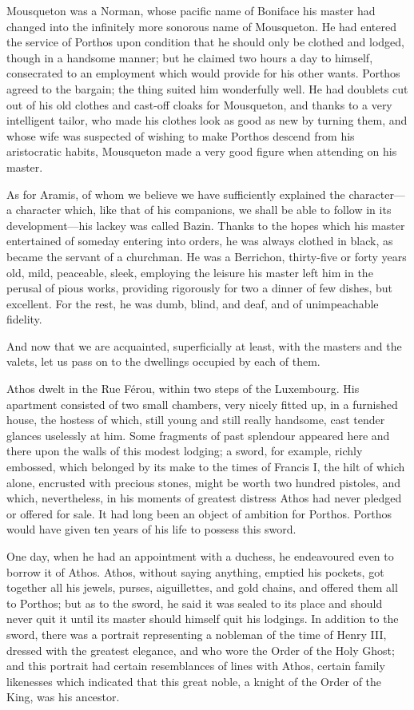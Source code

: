 Mousqueton was a Norman, whose pacific name of Boniface his master had changed into the infinitely more sonorous name of Mousqueton. He had entered the service of Porthos upon condition that he should only be clothed and lodged, though in a handsome manner; but he claimed two hours a day to himself, consecrated to an employment which would provide for his other wants. Porthos agreed to the bargain; the thing suited him wonderfully well. He had doublets cut out of his old clothes and cast-off cloaks for Mousqueton, and thanks to a very intelligent tailor, who made his clothes look as good as new by turning them, and whose wife was suspected of wishing to make Porthos descend from his aristocratic habits, Mousqueton made a very good figure when attending on his master. 

As for Aramis, of whom we believe we have sufficiently explained the character---a character which, like that of his companions, we shall be able to follow in its development---his lackey was called Bazin. Thanks to the hopes which his master entertained of someday entering into orders, he was always clothed in black, as became the servant of a churchman. He was a Berrichon, thirty-five or forty years old, mild, peaceable, sleek, employing the leisure his master left him in the perusal of pious works, providing rigorously for two a dinner of few dishes, but excellent. For the rest, he was dumb, blind, and deaf, and of unimpeachable fidelity. 

And now that we are acquainted, superficially at least, with the masters and the valets, let us pass on to the dwellings occupied by each of them. 

Athos dwelt in the Rue Férou, within two steps of the Luxembourg. His apartment consisted of two small chambers, very nicely fitted up, in a furnished house, the hostess of which, still young and still really handsome, cast tender glances uselessly at him. Some fragments of past splendour appeared here and there upon the walls of this modest lodging; a sword, for example, richly embossed, which belonged by its make to the times of Francis I, the hilt of which alone, encrusted with precious stones, might be worth two hundred pistoles, and which, nevertheless, in his moments of greatest distress Athos had never pledged or offered for sale. It had long been an object of ambition for Porthos. Porthos would have given ten years of his life to possess this sword. 

One day, when he had an appointment with a duchess, he endeavoured even to borrow it of Athos. Athos, without saying anything, emptied his pockets, got together all his jewels, purses, aiguillettes, and gold chains, and offered them all to Porthos; but as to the sword, he said it was sealed to its place and should never quit it until its master should himself quit his lodgings. In addition to the sword, there was a portrait representing a nobleman of the time of Henry III, dressed with the greatest elegance, and who wore the Order of the Holy Ghost; and this portrait had certain resemblances of lines with Athos, certain family likenesses which indicated that this great noble, a knight of the Order of the King, was his ancestor. 

